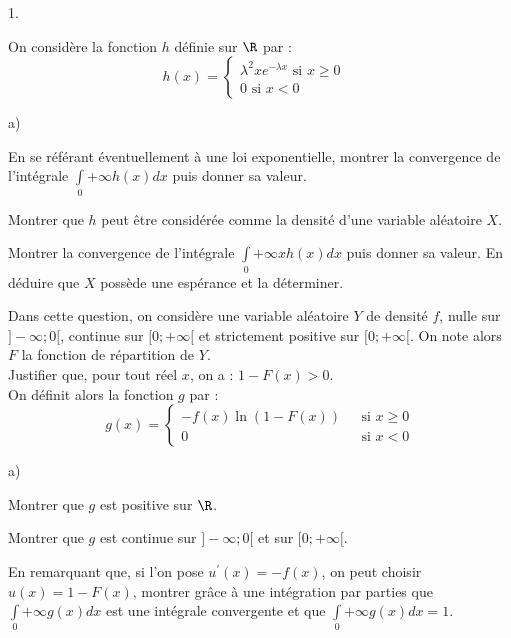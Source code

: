 \documentclass[11pt]{article}%
\begin{document}
\begin{noliste}{1.}
 \setlength{\itemsep}{4mm}
\item On considère la fonction $h$ définie sur $\R$ par : 
\[
h(x) = \left\{ 
\begin{array}{ll}
\lambda^{2}xe^{-\lambda x} \text{ si } x\geq 0 & \\
0 \text{ si } x<0 & 
\end{array}
\right.
\]

\begin{noliste}{a)}
 \setlength{\itemsep}{2mm}
\item En se référant éventuellement à une loi exponentielle,
montrer la convergence de l'intégrale $\int \limits_{0}{+
\infty}h(x)dx$
puis donner sa valeur.

\item Montrer que $h$ peut être considérée comme la densité
d'une variable aléatoire $X$.

\item Montrer la convergence de l'intégrale $\int
\limits_{0}{+ \infty}xh(x)dx$ puis donner sa valeur. En déduire que $X$
possède une espérance et la déterminer.
\end{noliste}

\item Dans cette question, on considère une variable aléatoire $Y$
de densité $f$, nulle sur $]-\infty ;0[$, continue sur $[0; + \infty
\lbrack $ et strictement positive sur $[0; + \infty \lbrack $. On note
alors $F $ la fonction de répartition de $Y$.\\
Justifier que, pour tout réel $x$, on a : $1-F(x)>0$.\\
On définit alors la fonction $g$ par : 
\[
g(x) = \left\{ 
\begin{array}{ll}
-f(x)\ln (1-F(x))\text{ } & \text{si }x\geq 0 \\
0 & \text{si }x<0
\end{array}
\right.
\]

\item 
\begin{noliste}{a)}
 \setlength{\itemsep}{2mm}
\item Montrer que $g$ est positive sur $\R$.

\item Montrer que $g$ est continue sur $]-\infty ;0[$ et sur $[0; +
\infty
\lbrack $.

\item En remarquant que, si l'on pose $u^{\prime }(x) = -f(x)$, on peut
choisir $u(x) = 1-F(x)$, montrer gr\^{a}ce à une intégration par
parties que $\int \limits_{0}{+ \infty }g(x)dx$ est une intégrale
convergente et que $\int \limits_{0}{+ \infty }g(x)dx = 1$.


\end{noliste}
\end{noliste}
\end{document}
